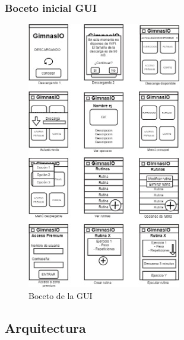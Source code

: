 \documentclass[11pt,a4paper]{report}
\begin{document}
\subsubsection{Boceto inicial GUI}
\begin{figure}[H]
	\centering
	\includegraphics[width=0.6\textwidth]{capturicas/bocGui.png}
	\caption{Boceto de la GUI}
	\label{fig: bocGUI}
\end{figure}
\subsection{Arquitectura}
\end{document}
